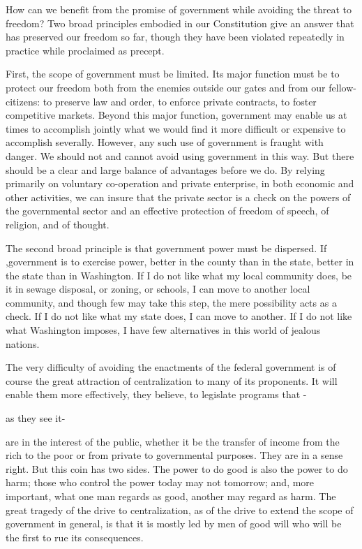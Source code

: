 \documentclass[11pt,openany]{book}
\begin{document}
How can we benefit from the promise of government while avoiding the threat to freedom? Two broad principles embodied in our Constitution give an answer that has preserved our freedom so far, though they have been violated repeatedly in practice while proclaimed as precept.

First, the scope of government must be limited. Its major function must be to protect our freedom both from the enemies outside our gates and from our fellow-citizens: to preserve law and order, to enforce private contracts, to foster competitive markets. Beyond this major function, government may enable us at times to accomplish jointly what we would find it more difficult or expensive to accomplish severally. However, any such use of government is fraught with danger. We should not and cannot avoid using government in this way. But there should be a clear and large balance of advantages before we do. By relying primarily on voluntary co-operation and private enterprise, in both economic and other activities, we can insure that the private sector is a check on the powers of the governmental sector and an effective protection of freedom of speech, of religion, and of thought.

The second broad principle is that government power must be dispersed. If ,government is to exercise power, better in the county than in the state, better in the state than in Washington. If I do not like what my local community does, be it in sewage disposal, or zoning, or schools, I can move to another local community, and though few may take this step, the mere possibility acts as a check. If I do not like what my state does, I can move to another. If I do not like what Washington imposes, I have few alternatives in this world of jealous nations.

The very difficulty of avoiding the enactments of the federal government is of course the great attraction of centralization to many of its proponents. It will enable them more effectively, they believe, to legislate programs that -

as they see it-

are in the interest of the public, whether it be the transfer of income from the rich to the poor or from private to governmental purposes. They are in a sense right. But this coin has two sides. The power to do good is also the power to do harm; those who control the power today may not tomorrow; and, more important, what one man regards as good, another may regard as harm. The great tragedy of the drive to centralization, as of the drive to extend the scope of government in general, is that it is mostly led by men of good will who will be the first to rue its consequences.
\end{document}
